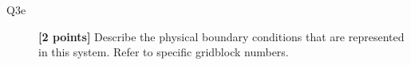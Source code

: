 \documentclass{article}
\begin{document}
\begin{description}
\item [Q3e]  \textbf{[2 points]}  Describe the physical boundary conditions that are represented in this system. Refer to specific gridblock  numbers.
\vspace{2.0cm}



\end{description}

\end{document}
